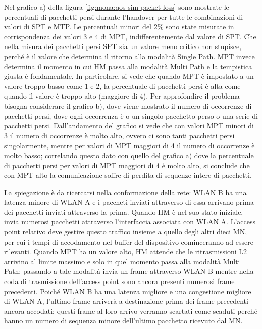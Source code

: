 \documentclass[12pt,a4paper,openright,twoside]{book}
\begin{document}
Nel grafico a) della figura \ref{fig:mona:qos-sim-packet-loss} sono
mostrate le percentuali di pacchetti persi durante l'handover per
tutte le combinazioni di valori di SPT e MTP.  Le percentuali minori
del 2\% sono state misurate in corrispondenza dei valori 3 e 4 di MPT,
indifferentemente dal valore di SPT.  Che nella misura dei pacchetti
persi SPT sia un valore meno critico non stupisce, perché è il valore
che determina il ritorno alla modalità Single Path. MPT invece
determina il momento in cui HM passa alla modalità Multi Path e la
tempistica giusta è fondamentale. In particolare, si vede che quando
MPT è impostato a un valore troppo basso come 1 e 2, la percentuale di
pacchetti persi è alta come quando il valore è troppo alto (maggiore
di 4). Per approfondire il problema bisogna considerare il grafico b),
dove viene mostrato il numero di occorrenze di pacchetti persi, dove
ogni occorrenza è o un singolo pacchetto perso o una serie di
pacchetti persi. Dall'andamento del grafico si vede che con valori MPT
minori di 3 il numero di occorrenze è molto alto, ovvero ci sono
tanti pacchetti persi singolarmente, mentre per valori di MPT maggiori
di 4 il numero di occorrenze è molto basso; correlando questo dato con
quello del grafico a) dove la percentuale di pacchetti persi per
valori di MPT maggiori di 4 è molto alto, si conclude che con MPT alto
la comunicazione soffre di perdita di sequenze intere di pacchetti.

La spiegazione è da ricercarsi nella conformazione della rete: WLAN B
ha una latenza minore di WLAN A e i paccheti inviati attraverso di
essa arrivano prima dei pacchetti inviati attraverso la prima. Quando
HM è nel suo stato iniziale, invia numerosi pacchetti attraverso
l'interfaccia associata con WLAN A. L'access point relativo deve
gestire questo traffico insieme a quello degli altri dieci MN, per cui
i tempi di accodamento nel buffer del dispositivo cominceranno ad
essere rilevanti. Quando MPT ha un valore alto, HM attende che le
ritrasmissioni L2 arrivino al limite massimo e solo in quel momento
passa alla modalità Multi Path; passando a tale modalità invia un
frame attraverso WLAN B mentre nella coda di trasmissione dell'access
point sono ancora presenti numerosi frame precedenti. Poiché WLAN B ha
una latenza migliore e una congestione migliore di WLAN A, l'ultimo
frame arriverà a destinazione prima dei frame precedenti ancora
accodati; questi frame al loro arrivo verranno scartati come scaduti
perché hanno un numero di sequenza minore dell'ultimo pacchetto
ricevuto dal MN.
\end{document}
